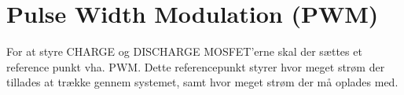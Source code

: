 \section{Pulse Width Modulation (PWM)}
For at styre CHARGE og DISCHARGE MOSFET'erne skal der sættes et reference punkt vha. PWM. Dette referencepunkt styrer hvor meget strøm der tillades at trække gennem systemet, samt hvor meget strøm der må oplades med. 
